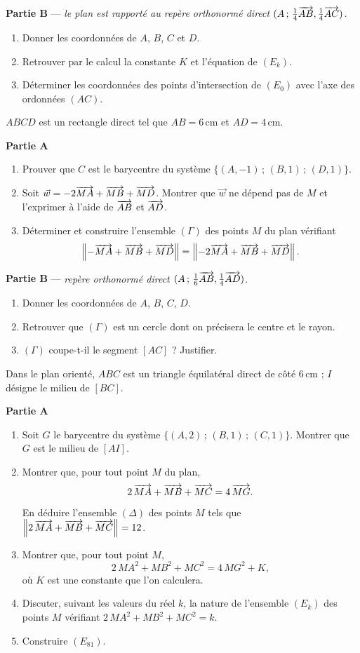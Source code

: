 \textbf{Partie B} — \textit{le plan est rapporté au repère orthonormé direct
$(A\,;\,\frac14\overrightarrow{AB},\frac14\overrightarrow{AC})$.}
\begin{enumerate}
	\item Donner les coordonnées de $A$, $B$, $C$ et $D$.
	\item Retrouver par le calcul la constante $K$ et l'équation de $(E_k)$.
	\item Déterminer les coordonnées des points d'intersection de $(E_0)$ avec
	l'axe des ordonnées $(AC)$.
\end{enumerate}

$ABCD$ est un rectangle direct tel que $AB = 6\,$cm et $AD = 4\,$cm.

\textbf{Partie A}
\begin{enumerate}
	\item Prouver que $C$ est le barycentre du système
	$\{(A,-1)\,;\,(B,1)\,;\,(D,1)\}$.
	\item Soit $\vec{w} = -2\overrightarrow{MA} + \overrightarrow{MB} + \overrightarrow{MD}$. Montrer que
	$\vec{w}$ ne dépend pas de $M$ et l'exprimer à l'aide de $\overrightarrow{AB}$ et
	$\overrightarrow{AD}$.
	\item Déterminer et construire l'ensemble $(\Gamma)$ des points $M$ du plan
	vérifiant
	$$
	\left\| -\overrightarrow{MA} + \overrightarrow{MB} + \overrightarrow{MD} \right\|
	= \left\| -2\overrightarrow{MA} + \overrightarrow{MB} + \overrightarrow{MD} \right\|.
	$$
\end{enumerate}

\textbf{Partie B} — \textit{repère orthonormé direct $(A\,;\,\frac16\overrightarrow{AB},\frac14\overrightarrow{AD})$.}
\begin{enumerate}
	\item Donner les coordonnées de $A$, $B$, $C$, $D$.
	\item Retrouver que $(\Gamma)$ est un cercle dont on précisera le centre et
	le rayon.
	\item $(\Gamma)$ coupe-t-il le segment $[AC]$ ? Justifier.
\end{enumerate}


Dans le plan orienté, $ABC$ est un triangle équilatéral direct de côté
$6\,$cm ; $I$ désigne le milieu de $[BC]$.

\textbf{Partie A}
\begin{enumerate}
	\item Soit $G$ le barycentre du système $\{(A,2)\,;\,(B,1)\,;\,(C,1)\}$.
	Montrer que $G$ est le milieu de $[AI]$.
	\item Montrer que, pour tout point $M$ du plan,
	$$
	2\,\overrightarrow{MA} + \overrightarrow{MB} + \overrightarrow{MC} = 4\,\overrightarrow{MG}.
	$$
	En déduire l'ensemble $(\Delta)$ des points $M$ tels que
	$\left\| 2\,\overrightarrow{MA} + \overrightarrow{MB} + \overrightarrow{MC} \right\| = 12$.
	\item Montrer que, pour tout point $M$,
	$$
	2\,MA^2 + MB^2 + MC^2 = 4\,MG^2 + K,
	$$
	où $K$ est une constante que l'on calculera.
	\item Discuter, suivant les valeurs du réel $k$, la nature de l'ensemble
	$(E_k)$ des points $M$ vérifiant $2\,MA^2 + MB^2 + MC^2 = k$.
	\item Construire $(E_{81})$.
\end{enumerate}

